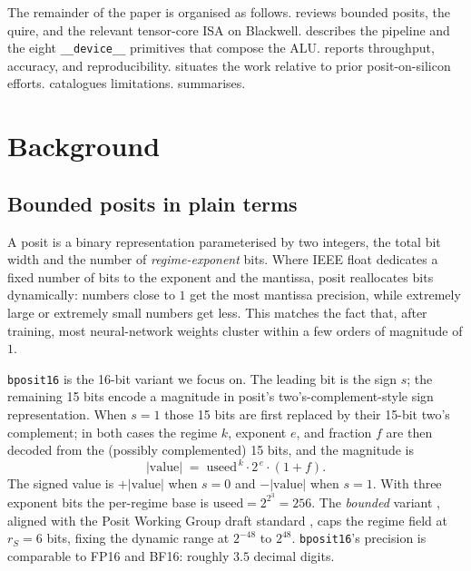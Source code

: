 \documentclass[11pt,a4paper]{article}
\newcommand{\bpsixteen}{\texttt{bposit16}}
\begin{document}
The remainder of the paper is organised as follows.
 reviews bounded posits, the quire, and the
relevant tensor-core ISA on Blackwell.  describes the
pipeline and the eight \texttt{\_\_device\_\_} primitives that compose
the ALU.  reports throughput, accuracy, and
reproducibility.  situates the work relative to
prior posit-on-silicon efforts.  catalogues
limitations.  summarises.

\section{Background}
\label{sec:background}

\subsection{Bounded posits in plain terms}

A posit is a binary representation parameterised by two integers, the
total bit width and the number of \emph{regime-exponent} bits. Where
IEEE float dedicates a fixed number of bits to the exponent and the
mantissa, posit reallocates bits dynamically: numbers close to $1$ get
the most mantissa precision, while extremely large or extremely small
numbers get less. This matches the fact that, after training, most
neural-network weights cluster within a few orders of magnitude of $1$.

\bpsixteen{} is the 16-bit variant we focus on. The leading bit is
the sign $s$; the remaining 15 bits encode a magnitude in posit's
two's-complement-style sign representation. When $s = 1$ those 15
bits are first replaced by their 15-bit two's complement; in both
cases the regime $k$, exponent $e$, and fraction $f$ are then
decoded from the (possibly complemented) 15 bits, and the magnitude
is
\[
    |\mathrm{value}| \;=\; \mathrm{useed}^{\,k} \cdot 2^{\,e} \cdot (1 + f).
\]
The signed value is $+|\mathrm{value}|$ when $s = 0$ and
$-|\mathrm{value}|$ when $s = 1$. With three exponent bits the
per-regime base is $\mathrm{useed} = 2^{2^3} = 256$. The
\emph{bounded} variant \cite{gustafson_endoferror}, aligned with the
Posit Working Group draft standard \cite{posit_2017}, caps the
regime field at $r_S = 6$ bits, fixing the dynamic range at
$2^{-48}$ to $2^{48}$. \bpsixteen{}'s precision is comparable to
FP16 and BF16: roughly $3.5$ decimal digits.
\end{document}
